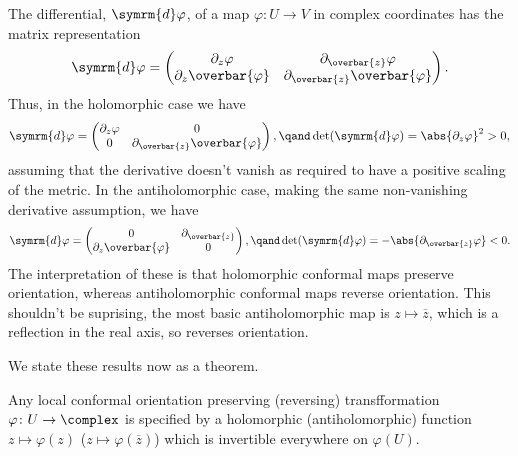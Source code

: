 \documentclass[fleqn]{NotesClass}
\renewcommand{\dl}[1]{\symrm{d}#1}
\begin{document}
    The differential, \(\dl{\varphi}\), of a map \(\varphi \colon U \to V\) in complex coordinates has the matrix representation
    \begin{equation}
        \dl{\varphi} = 
        \begin{pmatrix}
            \partial_z \varphi & \partial_{\overbar{z}} \varphi\\
            \partial_z \overbar{\varphi} & \partial_{\overbar{z}} \overbar{\varphi}
        \end{pmatrix}
        .
    \end{equation}
    Thus, in the holomorphic case we have
    \begin{equation}
        \dl{\varphi} = 
        \begin{pmatrix}
            \partial_z \varphi & 0\\
            0 & \partial_{\overbar{z}} \overbar{\varphi}
        \end{pmatrix}
        , \qand \det(\dl{\varphi}) = \abs{\partial_z \varphi}^2 > 0,
    \end{equation}
    assuming that the derivative doesn't vanish as required to have a positive scaling of the metric.
    In the antiholomorphic case, making the same non-vanishing derivative assumption, we have
    \begin{equation}
        \dl{\varphi} = 
        \begin{pmatrix}
            0 & \partial_{\overbar{z}}\\
            \partial_z \overbar{\varphi} & 0
        \end{pmatrix}
        , \qand \det(\dl{\varphi}) = - \abs{\partial_{\overbar{z}} \varphi} < 0.
    \end{equation}
    The interpretation of these is that holomorphic conformal maps preserve orientation, whereas antiholomorphic conformal maps reverse orientation.
    This shouldn't be suprising, the most basic antiholomorphic map is \(z \mapsto \overbar{z}\), which is a reflection in the real axis, so reverses orientation.
    
    We state these results now as a theorem.
    
    \begin{thm}{}{}
        Any local conformal orientation preserving (reversing) transfformation \(\varphi \colon U \to \complex\) is specified by a holomorphic (antiholomorphic) function \(z \mapsto \varphi(z)\) (\(z \mapsto \varphi(\overbar{z})\)) which is invertible everywhere on \(\varphi(U)\).
    \end{thm}
        
\end{document}
